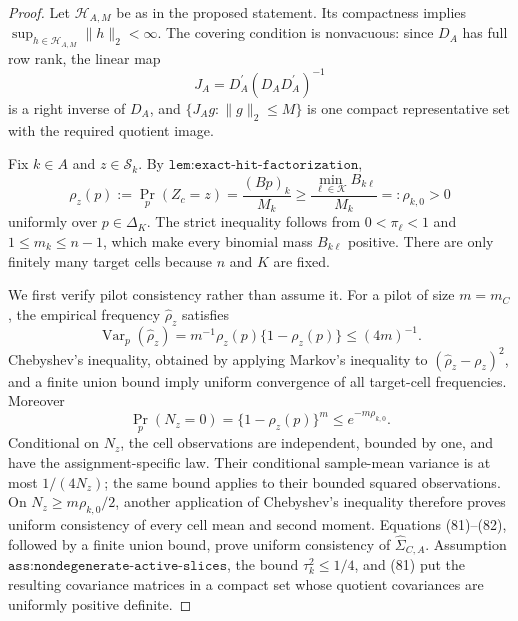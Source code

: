 \documentclass{article}
\begin{document}
\begin{proof}
Let \(\mathscr H_{A,M}\) be as in the proposed statement.  Its compactness implies \(\sup_{h\in\mathscr H_{A,M}}\lVert h\rVert_2<\infty\).  The covering condition is nonvacuous: since \(D_A\) has full row rank, the linear map
\[
J_A=D_A^{\prime}(D_AD_A^{\prime})^{-1}
\]
is a right inverse of \(D_A\), and \(\{J_Ag:\lVert g\rVert_2\leq M\}\) is one compact representative set with the required quotient image.

Fix \(k\in A\) and \(z\in\mathcal S_k\).  By \(\texttt{lem:exact-hit-factorization}\),
\[
\rho_z(p):=\Pr_p(Z_c=z)=\frac{(Bp)_k}{M_k}
\geq \frac{\min_{\ell\in\mathcal K}B_{k\ell}}{M_k}
=:\rho_{k,0}>0                                                   \tag{81}
\]
uniformly over \(p\in\Delta_K\).  The strict inequality follows from \(0<\pi_\ell<1\) and \(1\leq m_k\leq n-1\), which make every binomial mass \(B_{k\ell}\) positive.  There are only finitely many target cells because \(n\) and \(K\) are fixed.

We first verify pilot consistency rather than assume it.  For a pilot of size \(m=m_C\), the empirical frequency \(\widehat\rho_z\) satisfies
\[
\operatorname{Var}_p(\widehat\rho_z)
=m^{-1}\rho_z(p)\{1-\rho_z(p)\}\leq(4m)^{-1}.
\]
Chebyshev's inequality, obtained by applying Markov's inequality to \((\widehat\rho_z-\rho_z)^2\), and a finite union bound imply uniform convergence of all target-cell frequencies.  Moreover
\[
\Pr_p(N_z=0)=\{1-\rho_z(p)\}^{m}
\leq e^{-m\rho_{k,0}}.                                           \tag{82}
\]
Conditional on \(N_z\), the cell observations are independent, bounded by one, and have the assignment-specific law.  Their conditional sample-mean variance is at most \(1/(4N_z)\); the same bound applies to their bounded squared observations.  On \(N_z\geq m\rho_{k,0}/2\), another application of Chebyshev's inequality therefore proves uniform consistency of every cell mean and second moment.  Equations (81)--(82), followed by a finite union bound, prove uniform consistency of \(\widehat\Sigma_{C,A}\).  Assumption \(\texttt{ass:nondegenerate-active-slices}\), the bound \(\tau_k^2\leq1/4\), and (81) put the resulting covariance matrices in a compact set whose quotient covariances are uniformly positive definite.


\end{proof}
\end{document}
